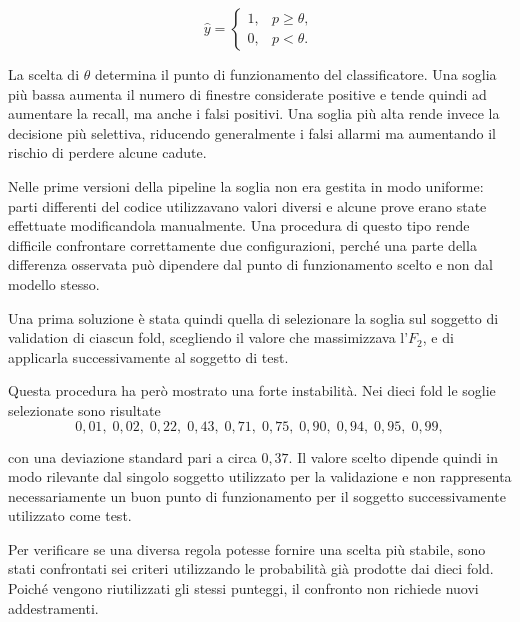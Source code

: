 \[
\hat{y} =
\begin{cases}
1, & p \geq \theta,\\
0, & p < \theta.
\end{cases}
\]

La scelta di $\theta$ determina il punto di funzionamento del classificatore. Una soglia più bassa aumenta il numero di finestre considerate positive e tende quindi ad aumentare la recall, ma anche i falsi positivi. Una soglia più alta rende invece la decisione più selettiva, riducendo generalmente i falsi allarmi ma aumentando il rischio di perdere alcune cadute.

Nelle prime versioni della pipeline la soglia non era gestita in modo uniforme: parti differenti del codice utilizzavano valori diversi e alcune prove erano state effettuate modificandola manualmente. Una procedura di questo tipo rende difficile confrontare correttamente due configurazioni, perché una parte della differenza osservata può dipendere dal punto di funzionamento scelto e non dal modello stesso.

Una prima soluzione è stata quindi quella di selezionare la soglia sul soggetto di validation di ciascun fold, scegliendo il valore che massimizzava l'$F_2$, e di applicarla successivamente al soggetto di test.

Questa procedura ha però mostrato una forte instabilità. Nei dieci fold le soglie selezionate sono risultate
\[
0{,}01,\;
0{,}02,\;
0{,}22,\;
0{,}43,\;
0{,}71,\;
0{,}75,\;
0{,}90,\;
0{,}94,\;
0{,}95,\;
0{,}99,
\]

con una deviazione standard pari a circa $0{,}37$. Il valore scelto dipende quindi in modo rilevante dal singolo soggetto utilizzato per la validazione e non rappresenta necessariamente un buon punto di funzionamento per il soggetto successivamente utilizzato come test.

Per verificare se una diversa regola potesse fornire una scelta più stabile, sono stati confrontati sei criteri utilizzando le probabilità già prodotte dai dieci fold. Poiché vengono riutilizzati gli stessi punteggi, il confronto non richiede nuovi addestramenti.

